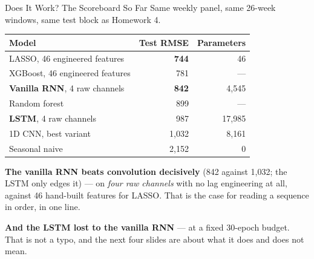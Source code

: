 \documentclass[aspectratio=169, 11pt]{beamer}
\begin{document}
\begin{frame}{Does It Work? The Scoreboard So Far}
  Same weekly panel, same 26-week windows, same test block as Homework 4.
  \begin{center}
    {\small
    \begin{tabular}{lrr}
      \toprule
      \textbf{Model} & \textbf{Test RMSE} & \textbf{Parameters} \\
      \midrule
      LASSO, 46 engineered features & \textbf{744} & 46 \\
      XGBoost, 46 engineered features & 781 & --- \\
      \textbf{Vanilla RNN}, 4 raw channels & \textbf{842} & 4{,}545 \\
      Random forest & 899 & --- \\
      \textbf{LSTM}, 4 raw channels & 987 & 17{,}985 \\
      1D CNN, best variant & 1{,}032 & 8{,}161 \\
      Seasonal naive & 2{,}152 & 0 \\
      \bottomrule
    \end{tabular}
    }
  \end{center}

  \vspace{-0.05cm}
  \textbf{The vanilla RNN beats convolution decisively} (842 against 1{,}032; the LSTM only
  edges it) --- on \emph{four raw channels} with no lag engineering at all, against 46 hand-built features for LASSO. That is the case for
  reading a sequence in order, in one line.

  \vspace{0.1cm}
  \textbf{And the LSTM lost to the vanilla RNN} --- at a fixed 30-epoch budget. That is not a
  typo, and the next four slides are about what it does and does not mean.
\end{frame}
\end{document}

